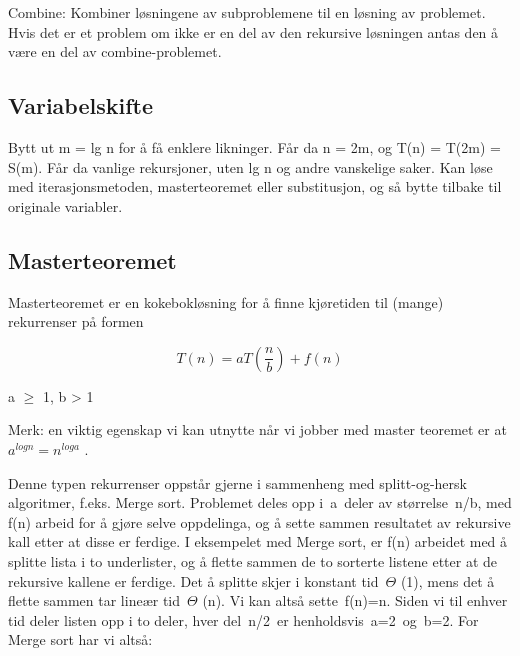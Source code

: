 \documentclass[12pt]{report}
\begin{document}
Combine: Kombiner løsningene av subproblemene til en løsning av problemet. Hvis det er et problem om ikke er en del av den rekursive løsningen antas den å være en del av combine-problemet.\par


\vspace{\baselineskip}
\subsection*{Variabelskifte}
Bytt ut m = lg n for å få enklere likninger. Får da n = 2m, og T(n) = T(2m) = S(m). Får da vanlige rekursjoner, uten lg n og andre vanskelige saker. Kan løse med iterasjonsmetoden, masterteoremet eller substitusjon, og så bytte tilbake til originale variabler. 


\newpage
\par

\subsection*{Masterteoremet}
Masterteoremet er en kokebokløsning for å finne kjøretiden til (mange) rekurrenser på formen\par

 \[ T \left( n \right) =aT \left( \frac{n}{b} \right) +f \left( n \right)  \] \par

\begin{Center}
a $ \geq $  1, b > 1
\end{Center}\par

\setlength{\parskip}{0.0pt}
Merk: en viktig egenskap vi kan utnytte når vi jobber med master teoremet er at  \( a^{logn}=n^{loga} \) .\par

Denne typen rekurrenser oppstår gjerne i sammenheng med splitt-og-hersk algoritmer, f.eks. Merge sort. Problemet deles opp i a deler av størrelse n/b, med f(n) arbeid for å gjøre selve oppdelinga, og å sette sammen resultatet av rekursive kall etter at disse er ferdige. I eksempelet med Merge sort, er f(n) arbeidet med å splitte lista i to underlister, og å flette sammen de to sorterte listene etter at de rekursive kallene er ferdige. Det å splitte skjer i konstant tid $ \Theta $ (1), mens det å flette sammen tar lineær tid $ \Theta $ (n). Vi kan altså sette f(n)=n. Siden vi til enhver tid deler listen opp i to deler, hver del n/2 er henholdsvis a=2 og b=2. For Merge sort har vi altså:\par
\end{document}
